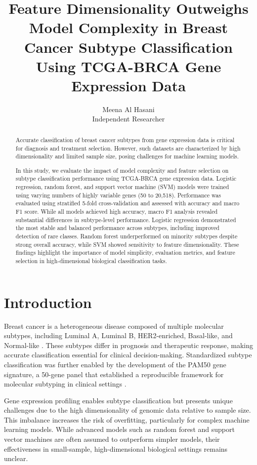 \documentclass[10pt,twocolumn,letterpaper]{article}
\title{\textbf{Feature Dimensionality Outweighs Model Complexity in Breast Cancer Subtype Classification Using TCGA-BRCA Gene Expression Data}}
\author{
    Meena Al Hasani \\
    Independent Researcher
}
\date{}
\begin{document}
\maketitle

\begin{abstract}
Accurate classification of breast cancer subtypes from gene expression data is critical for diagnosis and treatment selection. However, such datasets are characterized by high dimensionality and limited sample size, posing challenges for machine learning models.

In this study, we evaluate the impact of model complexity and feature selection on subtype classification performance using TCGA-BRCA gene expression data. Logistic regression, random forest, and support vector machine (SVM) models were trained using varying numbers of highly variable genes (50 to 20,518). Performance was evaluated using stratified 5-fold cross-validation and assessed with accuracy and macro F1 score. While all models achieved high accuracy, macro F1 analysis revealed substantial differences in subtype-level performance. Logistic regression demonstrated the most stable and balanced performance across subtypes, including improved detection of rare classes. Random forest underperformed on minority subtypes despite strong overall accuracy, while SVM showed sensitivity to feature dimensionality. These findings highlight the importance of model simplicity, evaluation metrics, and feature selection in high-dimensional biological classification tasks.
\end{abstract}

\section{Introduction}

Breast cancer is a heterogeneous disease composed of multiple molecular subtypes, including Luminal A, Luminal B, HER2-enriched, Basal-like, and Normal-like \cite{sorlie2001}. These subtypes differ in prognosis and therapeutic response, making accurate classification essential for clinical decision-making. Standardized subtype classification was further enabled by the development of the PAM50 gene signature, a 50-gene panel that established a reproducible framework for molecular subtyping in clinical settings \cite{parker2009}.

Gene expression profiling enables subtype classification but presents unique challenges due to the high dimensionality of genomic data relative to sample size. This imbalance increases the risk of overfitting, particularly for complex machine learning models. While advanced models such as random forest and support vector machines are often assumed to outperform simpler models, their effectiveness in small-sample, high-dimensional biological settings remains unclear.
\end{document}
